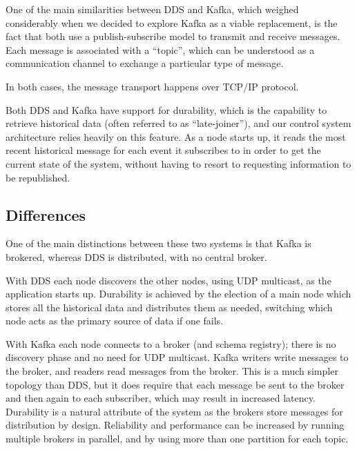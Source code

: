 \documentclass[]{spie}  %
\begin{document}
One of the main similarities between DDS and Kafka, which weighed considerably when we decided to explore Kafka as a viable replacement, is the fact that both use a publish-subscribe model to transmit and receive messages.
Each message is associated with a “topic”, which can be understood as a communication channel to exchange a particular type of message.

In both cases, the message transport happens over TCP/IP protocol.

Both DDS and Kafka have support for durability, which is the capability to retrieve historical data (often referred to as “late-joiner”), and our control system architecture relies heavily on this feature.
As a node starts up, it reads the most recent historical message for each event it subscribes to in order to get the current state of the system, without having to resort to requesting information to be republished.


\subsection{Differences}
\label{subsec:differences}

One of the main distinctions between these two systems is that Kafka is brokered, whereas DDS is distributed, with no central broker.

With DDS each node discovers the other nodes, using UDP multicast, as the application starts up.
Durability is achieved by the election of a main node which stores all the historical data and distributes them as needed, switching which node acts as the primary source of data if one fails.

With Kafka each node connects to a broker (and schema registry); there is no discovery phase and no need for UDP multicast.
Kafka writers write messages to the broker, and readers read messages from the broker.
This is a much simpler topology than DDS, but it does require that each message be sent to the broker and then again to each subscriber, which may result in increased latency.
Durability is a natural attribute of the system as the brokers store messages for distribution by design.
Reliability and performance can be increased by running multiple brokers in parallel, and by using more than one partition for each topic.
\end{document}
